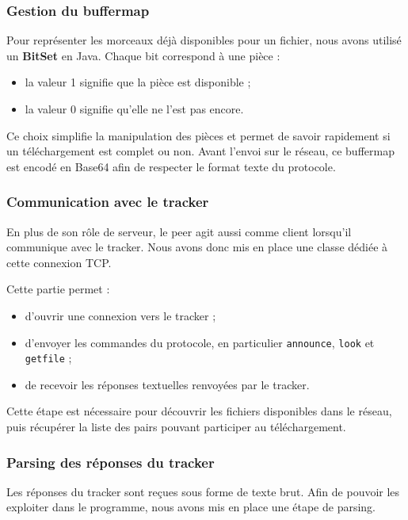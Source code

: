 \subsubsection{Gestion du buffermap}

Pour représenter les morceaux déjà disponibles pour un fichier, nous avons utilisé un \textbf{BitSet} en Java. Chaque bit correspond à une pièce :
\begin{itemize}
    \item la valeur 1 signifie que la pièce est disponible ;
    \item la valeur 0 signifie qu’elle ne l’est pas encore.
\end{itemize}

Ce choix simplifie la manipulation des pièces et permet de savoir rapidement si un téléchargement est complet ou non. Avant l’envoi sur le réseau, ce buffermap est encodé en Base64 afin de respecter le format texte du protocole.

\subsubsection{Communication avec le tracker}

En plus de son rôle de serveur, le peer agit aussi comme client lorsqu’il communique avec le tracker. Nous avons donc mis en place une classe dédiée à cette connexion TCP.

Cette partie permet :
\begin{itemize}
    \item d’ouvrir une connexion vers le tracker ;
    \item d’envoyer les commandes du protocole, en particulier \texttt{announce}, \texttt{look} et \texttt{getfile} ;
    \item de recevoir les réponses textuelles renvoyées par le tracker.
\end{itemize}

Cette étape est nécessaire pour découvrir les fichiers disponibles dans le réseau, puis récupérer la liste des pairs pouvant participer au téléchargement.




\subsubsection{Parsing des réponses du tracker}

Les réponses du tracker sont reçues sous forme de texte brut. Afin de pouvoir les exploiter dans le programme, nous avons mis en place une étape de parsing.

